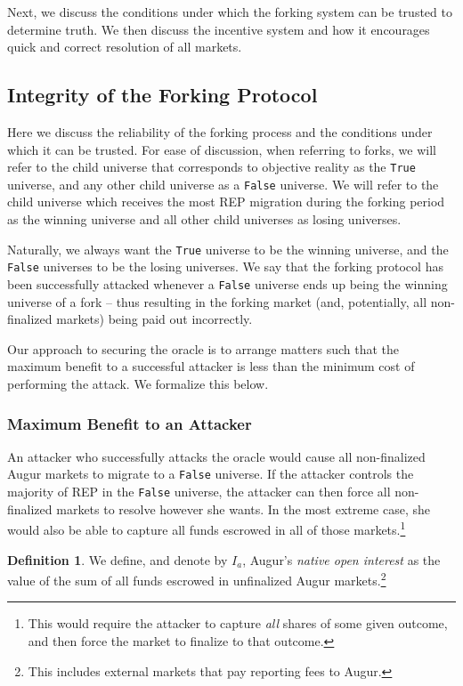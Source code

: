 \documentclass[floatfix,reprint,nofootinbib,amsmath,amssymb,epsfig,pre,floats,letterpaper,groupedaffiliation]{revtex4-1}
\theoremstyle{definition}
\theoremstyle{definition}
\newtheorem{definition}{Definition}
\begin{document}
Next, we discuss the conditions under which the forking system can be trusted to determine truth.  We then discuss the incentive system and how it encourages quick and correct resolution of all markets.

\subsection{Integrity of the Forking Protocol}\label{section:integrity_forking_protocol}

Here we discuss the reliability of the forking process and the conditions under which it can be trusted.  For ease of discussion, when referring to forks, we will refer to the child universe that corresponds to objective reality as the \texttt{True} universe, and any other child universe as a \texttt{False} universe.  We will refer to the child universe which receives the most REP migration during the forking period as the winning universe and all other child universes as losing universes.

Naturally, we always want the \texttt{True} universe to be the winning universe, and the \texttt{False} universes to be the losing universes.  We say that the forking protocol has been successfully attacked whenever a \texttt{False} universe ends up being the winning universe of a fork -- thus resulting in the forking market (and, potentially, all non-finalized markets) being paid out incorrectly.

Our approach to securing the oracle is to arrange matters such that the maximum benefit to a successful attacker is less than the minimum cost of performing the attack.  We formalize this below.

\subsubsection{Maximum Benefit to an Attacker}

An attacker who successfully attacks the oracle would cause all non-finalized Augur markets to migrate to a \texttt{False} universe.  If the attacker controls the majority of REP in the \texttt{False} universe, the attacker can then force all non-finalized markets to resolve however she wants.  In the most extreme case, she would also be able to capture all funds escrowed in all of those markets.\footnote{This would require the attacker to capture \textit{all} shares of some given outcome, and then force the market to finalize to that outcome.}

\begin{definition}
We define, and denote by $I_a$, Augur's \textit{native open interest} as the value of the sum of all funds escrowed in unfinalized Augur markets.\footnote{This includes external markets that pay reporting fees to Augur.}
\end{definition}
\end{document}
